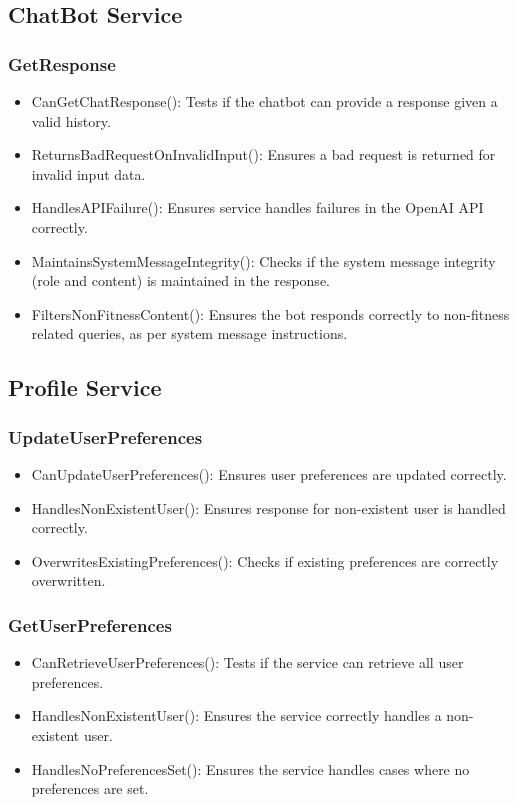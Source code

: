 \documentclass[12pt, titlepage]{article}
\begin{document}
\subsection{ChatBot Service}
\subsubsection{GetResponse}
\begin{itemize}
    \item CanGetChatResponse(): Tests if the chatbot can provide a response given a valid history.
    \item ReturnsBadRequestOnInvalidInput(): Ensures a bad request is returned for invalid input data.
    \item HandlesAPIFailure(): Ensures service handles failures in the OpenAI API correctly.
    \item MaintainsSystemMessageIntegrity(): Checks if the system message integrity (role and content) is maintained in the response.
    \item FiltersNonFitnessContent(): Ensures the bot responds correctly to non-fitness related queries, as per system message instructions.
\end{itemize}

\subsection{Profile Service}
\subsubsection{UpdateUserPreferences}
\begin{itemize}
    \item CanUpdateUserPreferences(): Ensures user preferences are updated correctly.
    \item HandlesNonExistentUser(): Ensures response for non-existent user is handled correctly.
    \item OverwritesExistingPreferences(): Checks if existing preferences are correctly overwritten.
\end{itemize}
\subsubsection{GetUserPreferences}
\begin{itemize}
    \item CanRetrieveUserPreferences(): Tests if the service can retrieve all user preferences.
    \item HandlesNonExistentUser(): Ensures the service correctly handles a non-existent user.
    \item HandlesNoPreferencesSet(): Ensures the service handles cases where no preferences are set.
\end{itemize}
\end{document}
